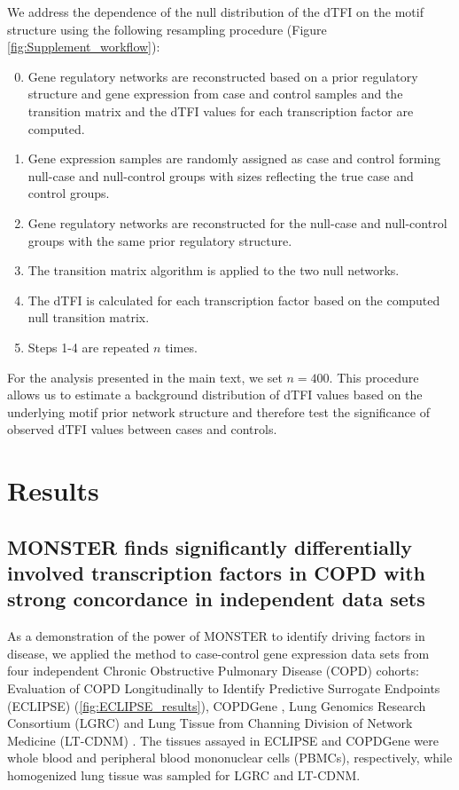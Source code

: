 We address the dependence of the null distribution of the dTFI on the motif structure using the following resampling procedure (Figure \ref{fig:Supplement_workflow}):
\begin{enumerate}
\setcounter{enumi}{-1}
\item Gene regulatory networks are reconstructed based on a prior regulatory structure and gene expression from case and control samples and the transition matrix and the dTFI values for each transcription factor are computed.
\item Gene expression samples are randomly assigned as case and control forming null-case and null-control groups with sizes reflecting the true case and control groups. 
\item Gene regulatory networks are reconstructed for the null-case and null-control groups with the same prior regulatory structure. 
\item The transition matrix algorithm is applied to the two null networks. 
\item The dTFI is calculated for each transcription factor based on the computed null transition matrix. 
\item  Steps 1-4 are repeated $n$ times. 
\end{enumerate}

For the analysis presented in the main text, we set $n=400$. This procedure allows us to estimate a background distribution of dTFI values based on the underlying motif prior network structure and therefore test the significance of observed dTFI values between cases and controls. 

\section{Results}

\subsection*{MONSTER finds significantly differentially involved transcription factors in COPD with strong concordance in independent data sets}

As a demonstration of the power of MONSTER to identify driving factors in disease, we applied the method to case-control gene expression data sets from four independent Chronic Obstructive Pulmonary Disease (COPD) cohorts: Evaluation of COPD Longitudinally to Identify Predictive Surrogate Endpoints (ECLIPSE) \cite{singh2014altered}\cite{vestbo2008evaluation} (\ref{fig:ECLIPSE_results}), COPDGene  \cite{regan2011genetic} \cite{bahr2013peripheral} \cite{pillai2009genome}, Lung Genomics Research Consortium (LGRC) \cite{lgrc} and Lung Tissue from Channing Division of Network Medicine (LT-CDNM) \cite{qiu2015network}. The tissues assayed in ECLIPSE and COPDGene were whole blood and peripheral blood mononuclear cells (PBMCs), respectively, while homogenized lung tissue was sampled for LGRC and LT-CDNM. 

